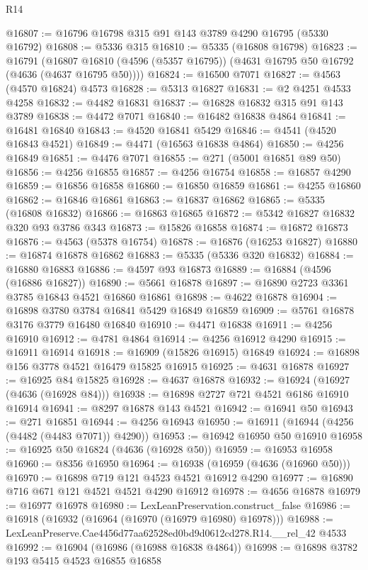 \begin{lexlean}{R14}
\begin{coremodule}
@16807 := @16796 @16798 @315 @91 @143 @3789 @4290 @16795 (@5330 @16792)
@16808 := @5336 @315
@16810 := @5335 (@16808 @16798)
@16823 := @16791
    (@16807 @16810 (@4596 (@5357 @16795)) (@4631 @16795 @50 @16792 (@4636 (@4637 @16795 @50))))
@16824 := @16500 @7071
@16827 := @4563 (@4570 @16824) @4573
@16828 := @5313 @16827
@16831 := @2 @4251 @4533 @4258
@16832 := @4482 @16831
@16837 := @16828 @16832 @315 @91 @143 @3789
@16838 := @4472 @7071
@16840 := @16482 @16838 @4864
@16841 := @16481 @16840
@16843 := @4520 @16841 @5429
@16846 := @4541 (@4520 @16843 @4521)
@16849 := @4471 (@16563 @16838 @4864)
@16850 := @4256 @16849
@16851 := @4476 @7071
@16855 := @271 (@5001 @16851 @89 @50)
@16856 := @4256 @16855
@16857 := @4256 @16754
@16858 := @16857 @4290
@16859 := @16856 @16858
@16860 := @16850 @16859
@16861 := @4255 @16860
@16862 := @16846 @16861
@16863 := @16837 @16862
@16865 := @5335 (@16808 @16832)
@16866 := @16863 @16865
@16872 := @5342 @16827 @16832 @320 @93 @3786 @343
@16873 := @15826 @16858
@16874 := @16872 @16873
@16876 := @4563 (@5378 @16754)
@16878 := @16876 (@16253 @16827)
@16880 := @16874 @16878 @16862
@16883 := @5335 (@5336 @320 @16832)
@16884 := @16880 @16883
@16886 := @4597 @93 @16873
@16889 := @16884 (@4596 (@16886 @16827))
@16890 := @5661 @16878
@16897 := @16890 @2723 @3361 @3785 @16843 @4521 @16860 @16861
@16898 := @4622 @16878
@16904 := @16898 @3780 @3784 @16841 @5429 @16849 @16859
@16909 := @5761 @16878 @3176 @3779 @16480 @16840
@16910 := @4471 @16838
@16911 := @4256 @16910
@16912 := @4781 @4864
@16914 := @4256 @16912 @4290
@16915 := @16911 @16914
@16918 := @16909 (@15826 @16915) @16849
@16924 := @16898 @156 @3778 @4521 @16479 @15825 @16915
@16925 := @4631 @16878
@16927 := @16925 @84 @15825
@16928 := @4637 @16878
@16932 := @16924 (@16927 (@4636 (@16928 @84)))
@16938 := @16898 @2727 @721 @4521 @6186 @16910 @16914
@16941 := @8297 @16878 @143 @4521
@16942 := @16941 @50
@16943 := @271 @16851
@16944 := @4256 @16943
@16950 := @16911 (@16944 (@4256 (@4482 (@4483 @7071)) @4290))
@16953 := @16942 @16950 @50 @16910
@16958 := @16925 @50 @16824 (@4636 (@16928 @50))
@16959 := @16953 @16958
@16960 := @8356 @16950
@16964 := @16938 (@16959 (@4636 (@16960 @50)))
@16970 := @16898 @719 @121 @4523 @4521 @16912 @4290
@16977 := @16890 @716 @671 @121 @4521 @4521 @4290 @16912
@16978 := @4656 @16878
@16979 := @16977 @16978
@16980 := LexLeanPreservation.construct_false
@16986 := @16918 (@16932 (@16964 (@16970 (@16979 @16980) @16978)))
@16988 := LexLeanPreserve.Cae4456d77aa62528ed0bd9d0612cd278.R14.__rel_42 @4533
@16992 := @16904 (@16986 (@16988 @16838 @4864))
@16998 := @16898 @3782 @193 @5415 @4523 @16855 @16858

\end{coremodule}
\end{lexlean}
